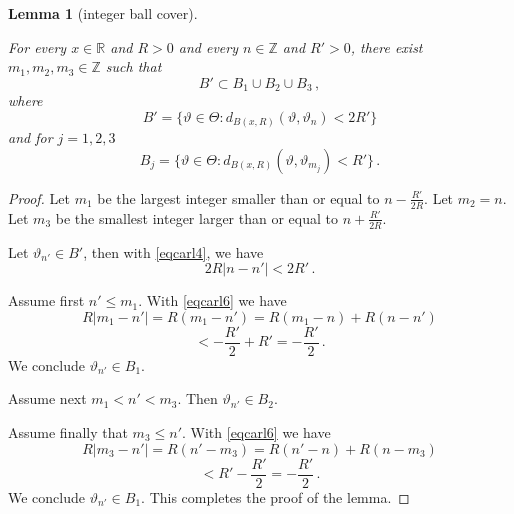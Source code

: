 \documentclass[10pt,a4paper]{article}
\theoremstyle{plain}
\newtheorem{lemma}[theorem]{Lemma}
\theoremstyle{definition}
\numberwithin{equation}{subsection}
\newcommand{\R}{{\mathbb{R}}}
\newcommand{\mfa}{{\vartheta}}
\newcommand{\Mf}{{\Theta}}
\newcommand{\lean}[1]{}
\newcommand{\leanok}{}
\begin{document}
\begin{lemma}[integer ball cover]
    \label{integer-ball-cover}
    \leanok
    \lean{integer_ball_cover}
    For every $x\in \R$ and $R>0$ and every
    $n\in \mathbb{Z}$ and $R'>0$,
    there exist $m_1, m_2, m_3\in \mathbb{Z}$
    such that
    \begin{equation}\label{eqcarl5}
        B'\subset B_1\cup B_2\cup B_3\, ,
    \end{equation}
where
\begin{equation}
B'= \{ \mfa \in \Mf: d_{B(x,R)}(\mfa, \mfa_n)<2R'\}
\end{equation}
and for $j=1,2,3$
\begin{equation}
  B_j=
     \{ \mfa \in \Mf: d_{B(x,R)}(\mfa, \mfa_{m_j})<R'\}
     \, .
\end{equation}
\end{lemma}

\begin{proof}
\leanok
Let $m_1$ be the largest integer smaller than
or equal to
$n- \frac {R'} {2R}$.
Let $m_2=n$.
Let $m_3$ be the smallest integer larger than
or equal to $n+ \frac {R'} {2R}$.

Let $\mfa_{n'}\in B'$, then with \eqref{eqcarl4},
we have
\begin{equation}\label{eqcarl6}
    2R|n-n'|< 2R'\, .
\end{equation}

Assume first $n'\le m_1$. With \eqref{eqcarl6}
we have
\begin{equation*}
    R|m_1-n'|=R(m_1-n')=R(m_1-n)+R(n-n')
\end{equation*}
\begin{equation}
    < -\frac{R'}2+R'=-\frac{R'}2\, .
\end{equation}
We conclude $\mfa_{n'}\in B_1$.

Assume next $m_1<n'<m_3$. Then
$\mfa_{n'}\in B_2$.

Assume finally that $m_3\le n'$. With \eqref{eqcarl6}
we have
\begin{equation*}
    R|m_3-n'|=R(n'-m_3)=R(n'-n)+R(n-m_3)
\end{equation*}
\begin{equation}
    < R' -\frac{R'}2=-\frac{R'}2\, .
\end{equation}
We conclude $\mfa_{n'}\in B_1$.
This completes the proof of the lemma.
\end{proof}
\end{document}

